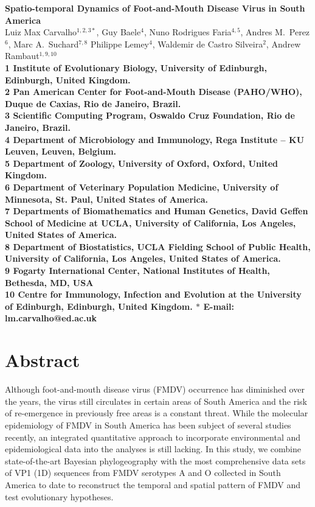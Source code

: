 \documentclass[10pt]{article}
\date{}
\begin{document}
\begin{flushleft}
{\Large
\textbf{Spatio-temporal Dynamics of Foot-and-Mouth Disease Virus in South America}
}
\\
Luiz Max Carvalho$^{1,2,3\ast}$,
Guy Baele$^{4}$,
Nuno Rodrigues Faria$^{4,5}$,
Andres M.~Perez$^{6}$,
Marc A.~Suchard$^{7,8}$
Philippe Lemey$^{4}$,
Waldemir de Castro Silveira$^{2}$,
Andrew Rambaut$^{1,9,10}$
\\
\bf{1} Institute of Evolutionary Biology, University of Edinburgh, Edinburgh, United Kingdom.\\
\bf{2} Pan American Center for Foot-and-Mouth Disease (PAHO/WHO), Duque de Caxias, Rio de Janeiro, Brazil.\\
\bf{3} Scientific Computing Program, Oswaldo Cruz Foundation, Rio de Janeiro, Brazil.\\
\bf{4} Department of Microbiology and Immunology, Rega Institute -- KU Leuven, Leuven, Belgium.\\
\bf{5} Department of Zoology, University of Oxford, Oxford, United Kingdom.\\
\bf{6} Department of Veterinary Population Medicine, University of Minnesota, St. Paul, United States of America.\\
\bf{7} Departments of Biomathematics and Human Genetics, David Geffen School of Medicine at UCLA, University of California, Los Angeles,  United States of America.\\
\bf{8} Department of Biostatistics, UCLA Fielding School of Public Health, University of California, Los Angeles,  United States of America.\\
\bf{9}  Fogarty International Center, National Institutes of Health, Bethesda, MD, USA\\
\bf{10} Centre for Immunology, Infection and Evolution at the University of Edinburgh, Edinburgh, United Kingdom.
$\ast$ E-mail: lm.carvalho@ed.ac.uk
\end{flushleft}
\section*{Abstract}

Although foot-and-mouth disease virus (FMDV) occurrence has diminished over the years, the virus still circulates in certain areas of South America and the risk of re-emergence in previously free areas is a constant threat.
While the molecular epidemiology of FMDV in South America has been subject of several studies recently, an integrated quantitative approach to incorporate environmental and epidemiological data into the analyses is still lacking.
In this study, we combine state-of-the-art Bayesian phylogeography with the most comprehensive data sets of VP1 (1D) sequences from FMDV serotypes A and O collected in South America to date  to  reconstruct the temporal and spatial pattern of FMDV and test evolutionary hypotheses.
\end{document}
